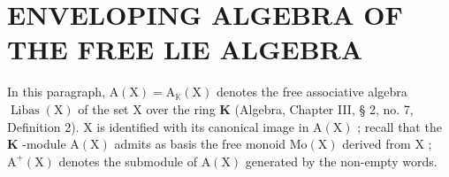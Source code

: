 \section{ENVELOPING ALGEBRA OF THE FREE LIE ALGEBRA}

In this paragraph, \(\mathrm{A}(\mathrm{X}) = \mathrm{A}_{\mathbb{K}}(\mathrm{X})\) denotes the free associative algebra \(\operatorname{Libas}(\mathrm{X})\) of the set \(\mathrm{X}\) over the ring \(\mathbf{K}\) (Algebra, Chapter III, § 2, no. 7, Definition 2). \(\mathrm{X}\) is identified with its canonical image in \(\mathrm{A}(\mathrm{X})\) ; recall that the \(\mathbf{K}\) -module \(\mathrm{A}(\mathrm{X})\) admits as basis the free monoid \(\mathrm{Mo}(\mathrm{X})\) derived from \(\mathrm{X}\) ; \(\mathrm{A}^{+}(\mathrm{X})\) denotes the submodule of \(\mathrm{A}(\mathrm{X})\) generated by the non-empty words.

